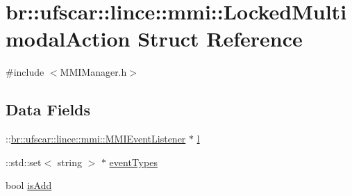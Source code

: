 \hypertarget{structbr_1_1ufscar_1_1lince_1_1mmi_1_1LockedMultimodalAction}{
\section{br::ufscar::lince::mmi::LockedMultimodalAction Struct Reference}
\label{structbr_1_1ufscar_1_1lince_1_1mmi_1_1LockedMultimodalAction}
}


{\ttfamily \#include $<$MMIManager.h$>$}

\subsection*{Data Fields}
\begin{DoxyCompactItemize}
\item 
::\hyperlink{classbr_1_1ufscar_1_1lince_1_1mmi_1_1MMIEventListener}{br::ufscar::lince::mmi::MMIEventListener} $\ast$ \hyperlink{structbr_1_1ufscar_1_1lince_1_1mmi_1_1LockedMultimodalAction_a290d66a9a01a9a81283860247eeaff10}{l}
\item 
::std::set$<$ string $>$ $\ast$ \hyperlink{structbr_1_1ufscar_1_1lince_1_1mmi_1_1LockedMultimodalAction_a3d8d1c55eacb7747c1e7d60fcb34a170}{eventTypes}
\item 
bool \hyperlink{structbr_1_1ufscar_1_1lince_1_1mmi_1_1LockedMultimodalAction_aaa42425599862561ea84845c72405b64}{isAdd}
\end{DoxyCompactItemize}


